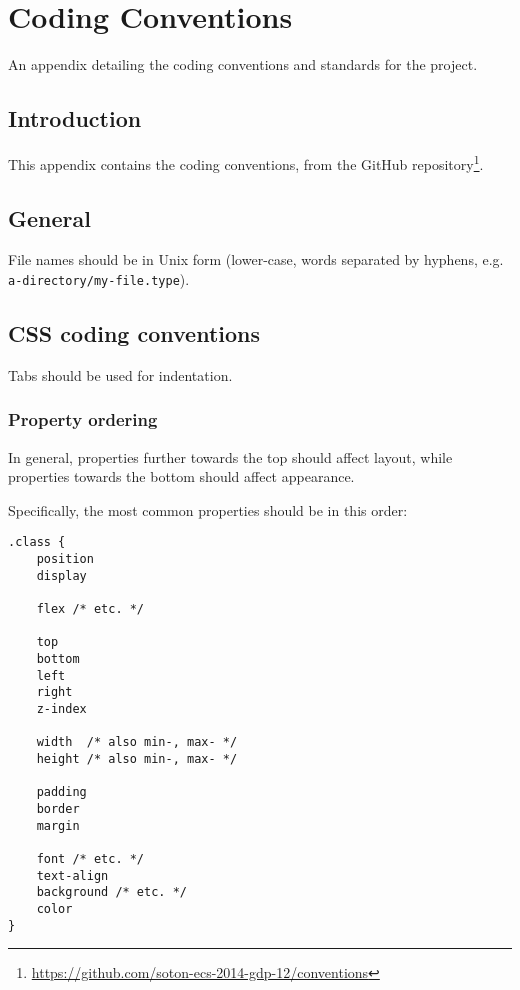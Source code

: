 \chapter{Coding Conventions} \label{App:Coding Conventions}

\begin{preamble}
	An appendix detailing the coding conventions and standards for the project.
\end{preamble}

\section{Introduction}

This appendix contains the coding conventions, from the GitHub repository\footnote{\url{https://github.com/soton-ecs-2014-gdp-12/conventions}}.

\section{General}

File names should be in Unix form (lower-case, words separated by
hyphens, e.g. \texttt{a-directory/my-file.type}).

\section{CSS coding conventions}

Tabs should be used for indentation.

\subsection{Property ordering}

In general, properties further towards the top should affect layout,
while properties towards the bottom should affect appearance.

Specifically, the most common properties should be in this order:

\begin{lstlisting}
.class {
	position
	display

	flex /* etc. */

	top
	bottom
	left
	right
	z-index

	width  /* also min-, max- */
	height /* also min-, max- */

	padding
	border
	margin

	font /* etc. */
	text-align
	background /* etc. */
	color
}
\end{lstlisting}

